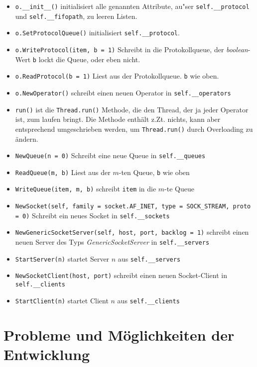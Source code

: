 \begin{itemize}
\item \texttt{o.\_\_init\_\_()} initialisiert alle genannten
  Attribute, au"ser \texttt{self.\_\_protocol} und
  \texttt{self.\_\_fifopath}, zu leeren Listen.
\item \texttt{o.SetProtocolQueue()} initialisiert
  \texttt{self.\_\_protocol}.
\item \texttt{o.WriteProtocol(item, b = 1)} Schreibt in die
  Protokollqueue, der \textit{boolean}-Wert \texttt{b} lockt die
  Queue, oder eben nicht.
\item \texttt{o.ReadProtocol(b = 1)} Liest aus der Protokollqueue.
  \texttt{b} wie oben.
\item \texttt{o.NewOperator()} schreibt einen neuen Operator in
  \texttt{self.\_\_operators}
\item \texttt{run()} ist die \texttt{Thread.run()} Methode, die den
  Thread, der ja jeder Operator ist, zum laufen bringt. Die Methode
  enth\"alt z.Zt. nichts, kann aber entsprechend umgeschrieben werden,
  um \texttt{Thread.run()} durch Overloading zu \"andern.
\item \texttt{NewQueue(n = 0)} Schreibt eine neue Queue in
  \texttt{self.\_\_queues}
\item \texttt{ReadQueue(m, b)} Liest aus der $m$-ten Queue, \texttt{b}
  wie oben
\item \texttt{WriteQueue(item, m, b)} schreibt \texttt{item} in die
  $m$-te Queue
\item \texttt{NewSocket(self, family = socket.AF\_INET, type =
    SOCK\_STREAM, proto = 0)} Schreibt ein neues Socket in
  \texttt{self.\_\_sockets}
\item \texttt{NewGenericSocketServer(self, host, port, backlog = 1)}
  schreibt einen neuen Server des Typs \textit{GenericSocketServer} in
  \texttt{self.\_\_servers}
\item \texttt{StartServer(n)} startet Server $n$ aus
  \texttt{self.\_\_servers}
\item \texttt{NewSocketClient(host, port)} schreibt einen neuen
  Socket-Client in \texttt{self.\_\_clients}
\item \texttt{StartClient(n)} startet Client $n$ aus
  \texttt{self.\_\_clients}
\end{itemize}

\section{Probleme und M\"oglichkeiten der Entwicklung}


